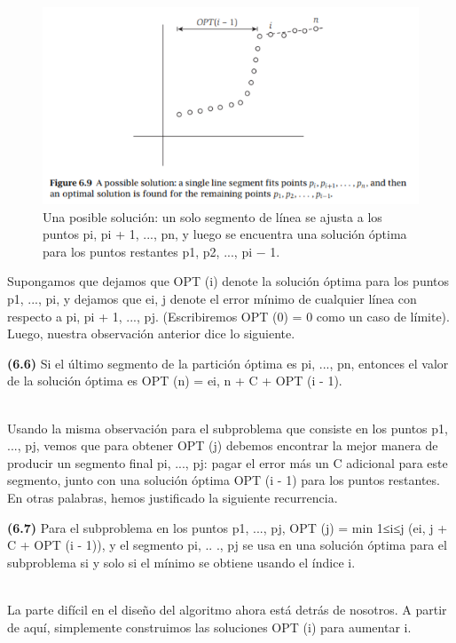 \documentclass[a4paper, 12pt]{book}
\theoremstyle{dotless}
\begin{document}
\begin{figure}
\includegraphics[scale=1.0]{Imagenes-Seccion6/fig6_9.PNG}
\caption{\label{Figura 6.9} Una posible solución: un solo segmento de línea se ajusta a los puntos pi, pi + 1, ..., pn, y luego se encuentra una solución óptima para los puntos restantes p1, p2, ..., pi − 1.}
\end{figure}

Supongamos que dejamos que OPT (i) denote la solución óptima para los puntos p1, ..., pi, y dejamos que ei, j denote el error mínimo de cualquier línea con respecto a pi, pi + 1, ..., pj. (Escribiremos OPT (0) = 0 como un caso de límite). Luego, nuestra observación anterior dice lo siguiente.\\

\colorbox{mygray}{\parbox{15cm}{
\textbf{(6.6)} Si el último segmento de la partición óptima es pi, ..., pn, entonces el valor de la solución óptima es OPT (n) = ei, n + C + OPT (i - 1).}}\\

Usando la misma observación para el subproblema que consiste en los puntos p1, ..., pj, vemos que para obtener OPT (j) debemos encontrar la mejor manera de producir un segmento final pi, ..., pj: pagar el error más un C adicional para este segmento, junto con una solución óptima OPT (i - 1) para los puntos restantes. En otras palabras, hemos justificado la siguiente recurrencia.\\

\colorbox{mygray}{\parbox{15cm}{
\textbf{(6.7)} Para el subproblema en los puntos p1, ..., pj, OPT (j) = min 1≤i≤j (ei, j + C + OPT (i - 1)), y el segmento pi, .. ., pj se usa en una solución óptima para el subproblema si y solo si el mínimo se obtiene usando el índice i.}}\\

La parte difícil en el diseño del algoritmo ahora está detrás de nosotros. A partir de aquí, simplemente construimos las soluciones OPT (i) para aumentar i.
\end{document}
